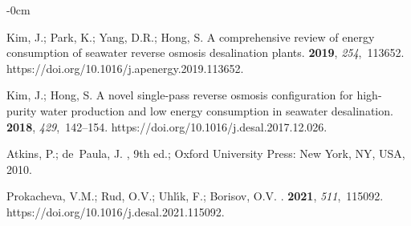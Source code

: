 \documentclass[gels,article,accept,pdftex,moreauthors]{Definitions/mdpi}
\begin{document}
\begin{adjustwidth}{-\extralength}{0cm}
\begin{thebibliography}{999}
Kim, J.; Park, K.; Yang, D.R.; Hong, S.
\newblock A comprehensive review of energy consumption of seawater reverse
  osmosis desalination plants.
 {\bf 2019}, {\em 254},~113652.
\newblock
  https://doi.org/10.1016/j.apenergy.2019.113652.%

Kim, J.; Hong, S.
\newblock A novel single-pass reverse osmosis configuration for high-purity
  water production and low energy consumption in seawater desalination.
 {\bf 2018}, {\em 429},~142--154.
\newblock
  https://doi.org/10.1016/j.desal.2017.12.026.%

Atkins, P.; de~Paula, J.
, 9th ed.; Oxford University Press:
  New York, NY, USA, 2010.

Prokacheva, V.M.; Rud, O.V.; Uhl\'{\i}k, F.; Borisov, O.V.
.
 {\bf 2021}, {\em 511},~115092.
\newblock
  https://doi.org/10.1016/j.desal.2021.115092.%

\end{thebibliography}



%


\end{adjustwidth}
\end{document}
